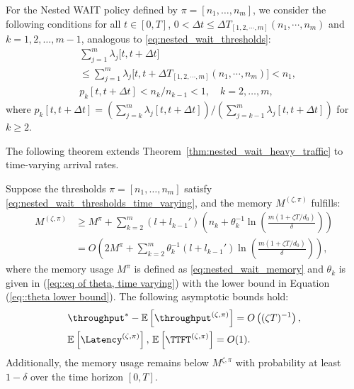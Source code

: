 For the Nested WAIT policy defined by $\pi = [n_1, \dots, n_m]$, we consider the following conditions for all $t\in [0, T]$, $0<\Delta t\leq \Delta T_{[1,2,\cdots,m]}(n_1,\cdots,n_m)$ and $k = 1, 2, \dots, m-1$, analogous to \eqref{eq:nested_wait_thresholds}:
\begin{equation}
    \label{eq:nested_wait_thresholds_time_varying}
\begin{aligned}
        & \sum_{j=1}^m \lambda_j\big[t, t + \Delta t\big] \\&\leq \sum_{j=1}^m \lambda_j\big[t, t +\Delta T_{[1,2,\cdots,m]}(n_1,\cdots,n_m)\big]< n_1, \\
        & p_k[t,t+\Delta t] < n_k/n_{k-1} < 1,\quad k=2,\dots,m,
\end{aligned}
\end{equation}
where $p_k[t,t+\Delta t] = (\sum_{j=k}^m\lambda_j[t,t+\Delta t])/(\sum_{j=k-1}^m\lambda_j[t,t+\Delta t])$ for \(k\ge2\).

The following theorem extends Theorem~\ref{thm:nested_wait_heavy_traffic} to time-varying arrival rates.

\begin{theorem}
\label{thm:nested_wait_heavy_traffic_time_varying}
Suppose the thresholds $\pi = [n_1, \dots, n_m]$ satisfy \eqref{eq:nested_wait_thresholds_time_varying}, and the memory $M^{(\zeta,\pi)}$ fulfills:
\[
\begin{aligned}
M^{(\zeta,\pi)}
&\geq M^{\pi} + \sum_{k=2}^m (l + l_{k-1}') \left(n_k + \theta_k^{-1} \ln\!\left( \tfrac{m(1+\zeta T/d_0)}{\delta} \right)\right) \\
    &= O\!\left( 2M^\pi + \sum_{k=2}^m \theta_k^{-1}  (l + l_{k-1}') \ln\!\left( \tfrac{m(1+\zeta T/d_0)}{\delta} \right) \right),
\end{aligned}
\]
where the memory usage $M^\pi$ is defined as \eqref{eq:nested_wait_memory} and $\theta_k$ is given in (\ref{eq::eq of theta, time varying}) with the lower bound in Equation (\ref{eq::theta lower bound}).
The following asymptotic bounds hold:
$$
    \begin{aligned}
        &\throughput^* - \mathbb{E}\left[ \throughput^{(\zeta, \pi)} \right] 
   = O\left( (\zeta T)^{-1} \right), \\
&\mathbb{E}\left[ \Latency^{(\zeta, \pi)} \right], \,\mathbb{E}\left[ \TTFT^{(\zeta, \pi)} \right] = O(1).
    \end{aligned}
$$
Additionally, the memory usage remains below $M^{\zeta,\pi}$ with probability at least $1 - \delta$ over the time horizon $[0,T].$
\end{theorem}

